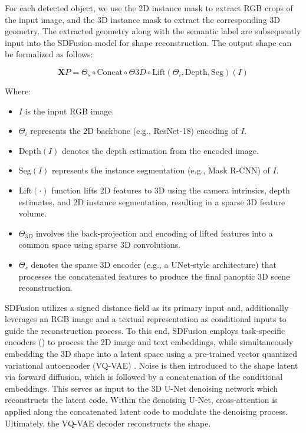 For each detected object, we use the 2D instance mask to extract RGB crops of the input image, and the 3D instance mask to extract the corresponding 3D geometry.
The extracted geometry along with the semantic label are subsequently input into the SDFusion model for shape reconstruction. The output shape can be formalized as follows:

\begin{equation}
\mathbf{X}P = \Theta_s \circ \text{Concat} \circ \Theta{3D} \circ \text{Lift} \left( \Theta_i, \text{Depth}, \text{Seg} \right) (I)
\end{equation}

Where:
\begin{itemize}
    \item \(I\) is the input RGB image.
    \item \(\Theta_i\) represents the 2D backbone (e.g., ResNet-18) encoding of \(I\).
    \item \(\text{Depth}(I)\) denotes the depth estimation from the encoded image.
    \item \(\text{Seg}(I)\) represents the instance segmentation (e.g., Mask R-CNN) of \(I\).
    \item \(\text{Lift}(\cdot)\) function lifts 2D features to 3D using the camera intrinsics, depth estimates, and 2D instance segmentation, resulting in a sparse 3D feature volume.
    \item \(\Theta_{3D}\) involves the back-projection and encoding of lifted features into a common space using sparse 3D convolutions.
    \item \(\Theta_s\) denotes the sparse 3D encoder (e.g., a UNet-style architecture) that processes the concatenated features to produce the final panoptic 3D scene reconstruction.
\end{itemize}

SDFusion \cite{cheng2023sdfusion} utilizes a signed distance field as its primary input and, additionally leverages an RGB image and a textual representation as conditional inputs to guide the reconstruction process. To this end, SDFusion employs task-specific encoders (\citep{radford2021learning, devlin2018bert}) to process the 2D image and text embeddings, while simultaneously embedding the 3D shape into a latent space using a pre-trained vector quantized variational autoencoder (VQ-VAE) \citep{oord2017neural}. Noise is then introduced to the shape latent via forward diffusion, which is followed by a concatenation of the conditional embeddings. This serves as input to the 3D U-Net \citep{ronneberger2015u} denoising network which reconstructs the latent code. Within the denoising U-Net, cross-attention is applied along the concatenated latent code to modulate the denoising process. Ultimately, the VQ-VAE decoder reconstructs the shape.

